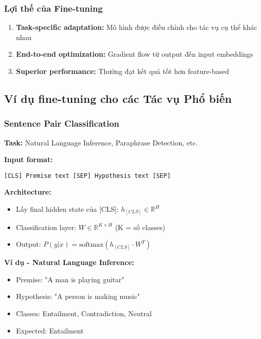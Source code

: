 \subsubsection{Lợi thế của Fine-tuning}
\begin{enumerate}
    \item \textbf{Task-specific adaptation:} Mô hình được điều chỉnh cho tác vụ cụ thể khác nhau
    \item \textbf{End-to-end optimization:} Gradient flow từ output đến input embeddings
    \item \textbf{Superior performance:} Thường đạt kết quả tốt hơn feature-based
\end{enumerate}

\subsection{Ví dụ fine-tuning cho các Tác vụ Phổ biến}
\label{ssec:vi_du_tinh_chinh}

\subsubsection{Sentence Pair Classification}
\textbf{Task:} Natural Language Inference, Paraphrase Detection, etc.

\textbf{Input format:}
\begin{verbatim}
[CLS] Premise text [SEP] Hypothesis text [SEP]
\end{verbatim}

\textbf{Architecture:}
\begin{itemize}
    \item Lấy final hidden state của [CLS]: $h_{[CLS]} \in \mathbb{R}^H$
    \item Classification layer: $W \in \mathbb{R}^{K \times H}$ (K = số classes)
    \item Output: $P(y|x) = \text{softmax}(h_{[CLS]} \cdot W^T)$
\end{itemize}

\textbf{Ví dụ - Natural Language Inference:}
\begin{itemize}
    \item Premise: "A man is playing guitar"
    \item Hypothesis: "A person is making music"
    \item Classes: Entailment, Contradiction, Neutral
    \item Expected: Entailment
\end{itemize}

